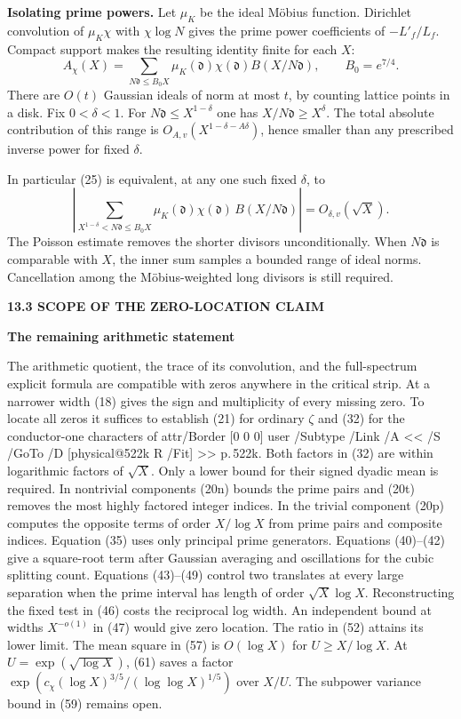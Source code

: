 \documentclass[11pt,letterpaper]{article}
\makeatletter
\newcommand{\rightmarktext}{}
\newcommand{\printfolio}{}
\newcommand{\leaf}[4]{\clearpage\gdef\printfolio{#1}\gdef\rightmarktext{#2}%
  {\small\sffamily\bfseries\color{ink}#3\par}\vspace{3pt}%
  {\LARGE\bfseries #4\par}\vspace{5pt}}
\newcommand{\point}[1]{\par\smallskip\textbf{#1.}\enspace\ignorespaces}
\newcommand{\MusicPDFPageRef}[1]{\pdfpageref\csname physical@#1\endcsname\space\space 0 R}
\newcommand{\pagelink}[2]{\leavevmode\pdfstartlink attr{/Border [0 0 0]} user{%
  /Subtype /Link /A << /S /GoTo /D [\MusicPDFPageRef{#1} /Fit] >>}%
  {\color{ink}#2}\pdfendlink}
\newcommand{\pg}[1]{\pagelink{#1}{p.\,#1}}
\makeatother
\begin{document}
\point{Isolating prime powers} Let $\mu_K$ be the ideal M\"obius function.
Dirichlet convolution of $\mu_K\chi$ with $\chi\log N$ gives the prime
power coefficients of $-L'_f/L_f$. Compact support makes the resulting
identity finite for each $X$:
\[
 A_\chi(X)=\sum_{N\mathfrak d\le B_0 X}
          \mu_K(\mathfrak d)\chi(\mathfrak d)
                       B(X/N\mathfrak d),\qquad B_0=e^{7/4}.
\]
There are $O(t)$ Gaussian ideals of norm at most $t$, by counting lattice
points in a disk. Fix $0<\delta<1$. For $N\mathfrak d\le X^{1-\delta}$
one has $X/N\mathfrak d\ge X^\delta$. The total absolute contribution
of this range is $O_{A,v}(X^{1-\delta-A\delta})$, hence smaller than
any prescribed inverse power for fixed $\delta$.

In particular (25) is equivalent, at any one such fixed $\delta$, to
\[
 \left|\sum_{X^{1-\delta}<N\mathfrak d\le B_0X}
       \mu_K(\mathfrak d)\chi(\mathfrak d)\,B(X/N\mathfrak d)\right|
       =O_{\delta,v}(\sqrt X).
 \tag{26}
\]
The Poisson estimate removes the shorter divisors unconditionally.
When $N\mathfrak d$ is comparable with $X$, the inner sum samples a
bounded range of ideal norms. Cancellation among the M\"obius-weighted
long divisors is still required.

\leaf{522e}{Conclusions}{13.3 \quad SCOPE OF THE ZERO-LOCATION CLAIM}{The remaining arithmetic statement}
The arithmetic quotient, the trace of its convolution, and the full-spectrum
explicit formula are compatible with zeros anywhere in the critical strip.
At a narrower width (18) gives the sign and multiplicity of every
missing zero. To locate all zeros it suffices to establish (21) for
ordinary $\zeta$ and (32) for the conductor-one characters of \pg{522k}.
Both factors in (32) are within logarithmic factors of $\sqrt X$.
Only a lower bound for their signed dyadic mean is required. In
nontrivial components (20n) bounds the prime pairs and (20t) removes
the most highly factored integer indices. In the trivial component
(20p) computes the opposite terms of order $X/\log X$ from prime
pairs and composite indices. Equation (35) uses only principal prime
generators. Equations (40)--(42) give a square-root term after Gaussian
averaging and oscillations for the cubic splitting count. Equations
(43)--(49) control two translates at every large separation when the
prime interval has length of order $\sqrt X\log X$. Reconstructing the
fixed test in (46) costs the reciprocal log width. An independent
bound at widths $X^{-o(1)}$ in (47) would give zero location.
The ratio in (52) attains its lower limit. The mean square in (57)
is $O(\log X)$ for $U\ge X/\log X$. At $U=\exp(\sqrt{\log X})$,
(61) saves a factor $\exp(c_\chi(\log X)^{3/5}/(\log\log X)^{1/5})$
over $X/U$. The subpower variance bound in (59) remains open.
\end{document}
